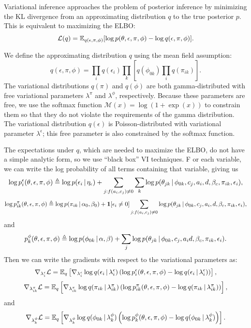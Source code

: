 Variational inference approaches the problem of posterior inference by minimizing the KL divergence from an approximating distribution $q$ to the true posterior $p$.
This is equivalent to maximizing the ELBO: \[\mathcal{L}(q)  = \mathbb{E}_{q(\epsilon, \pi, \phi)}[\log p(\theta,\epsilon,\pi,\phi) - \log q(\epsilon, \pi, \phi)].\]

We define the approximating distribution $q$ using the mean field assumption: \[q(\epsilon, \pi, \phi) = \prod_i q(\epsilon_{i})\prod_k\left[q(\phi_{0k})\prod_i q(\pi_{ik})\right].\]
The variational distributions $q(\pi)$ and $q(\phi)$ are both gamma-distributed with free variational parameters $\lambda^\pi$ and $\lambda^\phi$, respectively.  Because these parameters are free, we use the softmax function $\mathcal{M}(x) = \log(1+\exp(x))$ to constrain them so that they do not violate the requirements of the gamma distribution.
The variational distribution $q(\epsilon)$ is Poisson-distributed with variational parameter $\lambda^\epsilon$; this free parameter is also constrained by the softmax function.

The expectations under $q$, which are needed to maximize the ELBO, do not have a simple analytic form, so we use ``black box'' VI techniques.
F or each variable, we can write the log probability of all terms containing that variable, giving us 
\[\log p^\epsilon_{i}(\theta, \epsilon, \pi, \phi) \triangleq \log p(\epsilon_{i} \, | \, \eta_\epsilon) + \sum_{j : f(a_i, c_j) \neq 0}\sum_k\log p(\theta_{jk} \, | \, \phi_{0k}, c_j, a_i, d, \beta_c, \pi_{ik}, \epsilon_i),\]
\[\log p^\pi_{ik}(\theta, \epsilon, \pi, \phi) \triangleq \log p(\pi_{ik} \, | \, \alpha_0, \beta_0) + \mathbf{1}[\epsilon_i \neq 0] \sum_{j : f(a_i, c_j) \neq 0}\log p(\theta_{jk} \, | \, \phi_{0k}, c_j, a_i, d, \beta_c, \pi_{ik}, \epsilon_i),\]
and
\[p^\phi_{k}(\theta, \epsilon, \pi, \phi) \triangleq \log p(\phi_{0k} \, | \, \alpha, \beta) + \sum_{j} \log p(\theta_{jk} \, | \, \phi_{0k}, c_j, a_i d, \beta_c, \pi_{ik}, \epsilon_i).\]
Then we can write the gradients with respect to the variational parameters as:
\[\nabla_{\lambda^\epsilon_{i}} \mathcal{L} = \mathbb{E}_q \left[ \nabla_{\lambda^\epsilon_{i}} \log q(\epsilon_{i} \, | \, \lambda^\epsilon_{i}) \left( \log p^\epsilon_{i}(\theta, \epsilon, \pi, \phi) - \log q(\epsilon_{i} \, | \, \lambda^\epsilon_{i}) \right)\right],\]
\[\nabla_{\lambda^\pi_{ik}} \mathcal{L} = \mathbb{E}_q \left[ \nabla_{\lambda^\pi_{ik}} \log q(\pi_{ik} \, | \, \lambda^\pi_{ik}) \left( \log p^\pi_{ik}(\theta, \epsilon, \pi, \phi) - \log q(\pi_{ik} \, | \, \lambda^\pi_{ik}) \right)\right],\]
and
\[\nabla_{\lambda^\phi_{k}} \mathcal{L} = \mathbb{E}_q \left[ \nabla_{\lambda^\phi_{k}} \log q(\phi_{0k} \, | \, \lambda^\phi_{k}) \left( \log p^\phi_{k}(\theta, \epsilon, \pi, \phi) - \log q(\phi_{0k} \, | \, \lambda^\phi_{k}) \right)\right].\]

